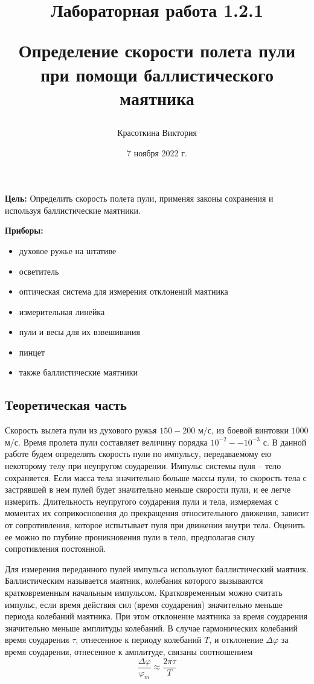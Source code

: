 \documentclass[a4paper,12pt]{article}
\author{Красоткина Виктория}
\title{Лабораторная работа 1.2.1

Определение скорости полета пули при помощи баллистического маятника}
\date{7 ноября 2022 г.}
\begin{document}
\maketitle
\thispagestyle{empty}

\newpage
\setcounter{page}{1}

\textbf{Цель:}
Определить скорость полета пули, применяя законы сохранения и используя баллистические маятники.

\textbf{Приборы:}
\begin{itemize}
    \item духовое ружье на штативе
    \item осветитель
    \item оптическая система для измерения отклонений маятника
    \item измерительная линейка
    \item пули и весы для их взвешивания
    \item пинцет
    \item также баллистические маятники
\end{itemize}

\subsection*{Теоретическая часть}
Скорость вылета пули из духового ружья $150-200$ м/с, из боевой винтовки $1000$ м/с. Время пролета пули составляет величину порядка $10^{-2} -- 10^{-3}$ с. В данной работе будем определять скорость пули по импульсу, передаваемому ею некоторому телу при неупругом соударении. Импульс системы пуля -- тело сохраняется. Если масса тела значительно больше массы пули, то скорость тела с застрявшей в нем пулей будет значительно меньше скорости пули, и ее легче измерить. Длительность неупругого соударения пули и тела, измеряемая с моментах их соприкосновения до прекращения относительного движения, зависит от сопротивления, которое испытывает пуля при движении внутри тела. Оценить ее можно по глубине проникновения пули в тело, предполагая силу сопротивления постоянной.

Для измерения переданного пулей импульса используют баллистический маятник. Баллистическим называется маятник, колебания которого вызываются кратковременным начальным импульсом. Кратковременным можно считать импульс, если время действия сил (время соударения) значительно меньше периода колебаний маятника. При этом отклонение маятника за время соударения значительно меньше амплитуды колебаний. В случае гармонических колебаний время соударения $\tau$, отнесенное к периоду колебаний $T$, и отклонение $\Delta \varphi$ за время соударения, отнесенное к амплитуде, связаны соотношением 
$$
\frac{\Delta\varphi}{\varphi_{m}} \approx \frac{2\pi \tau}{T}
$$
\end{document}

